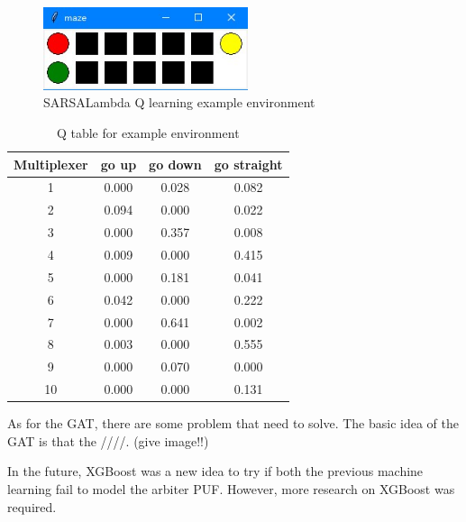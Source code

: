 \begin{figure}[htp]
    \centering
    \includegraphics[width=6cm]{figures/figure11.jpg}
    \caption{SARSALambda Q learning example environment}
    \label{fig:figure11}
    \end{figure}

\begin{table}[ht]
    \center
    \begin{tabular}{c|ccc}
    Multiplexer & go up & go down & go straight\\
    \hline
    1 & 0.000 & 0.028 & 0.082\\
    2 & 0.094 & 0.000 & 0.022\\
    3 & 0.000 & 0.357 & 0.008\\
    4 & 0.009 & 0.000 & 0.415\\
    5 & 0.000 & 0.181 & 0.041\\
    6 & 0.042 & 0.000 & 0.222\\
    7 & 0.000 & 0.641 & 0.002\\
    8 & 0.003 & 0.000 & 0.555\\
    9 & 0.000 & 0.070 & 0.000\\
    10 & 0.000 & 0.000 & 0.131\\
    \end{tabular}
    \caption{Q table for example environment}
    \label{tab:table1}
    \end{table}

As for the GAT, there are some problem that need to solve. The basic idea of the GAT is that the ////. (give image!!)


In the future, XGBoost was a new idea to try if both the previous machine learning fail to model the arbiter PUF. However, more research on XGBoost was required.



